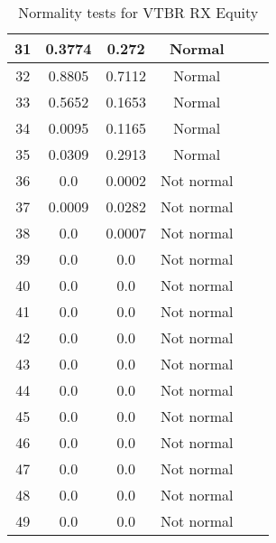 \begin{table}[h]
\begin{tabular}{|c|c|c|c|c|c|}
		31 & 0.3774 & 0.272 & Normal\\\hline
		32 & 0.8805 & 0.7112 & Normal\\\hline
		33 & 0.5652 & 0.1653 & Normal\\\hline
		34 & 0.0095 & 0.1165 & Normal\\\hline
		35 & 0.0309 & 0.2913 & Normal\\\hline
		36 & 0.0 & 0.0002 & Not normal\\\hline
		37 & 0.0009 & 0.0282 & Not normal\\\hline
		38 & 0.0 & 0.0007 & Not normal\\\hline
		39 & 0.0 & 0.0 & Not normal\\\hline
		40 & 0.0 & 0.0 & Not normal\\\hline
		41 & 0.0 & 0.0 & Not normal\\\hline
		42 & 0.0 & 0.0 & Not normal\\\hline
		43 & 0.0 & 0.0 & Not normal\\\hline
		44 & 0.0 & 0.0 & Not normal\\\hline
		45 & 0.0 & 0.0 & Not normal\\\hline
		46 & 0.0 & 0.0 & Not normal\\\hline
		47 & 0.0 & 0.0 & Not normal\\\hline
		48 & 0.0 & 0.0 & Not normal\\\hline
		49 & 0.0 & 0.0 & Not normal\\\hline
	\end{tabular}
	\caption{Normality tests for VTBR RX Equity}
	\label{tab:normality_tests_VTBR_RX}
\end{table}

